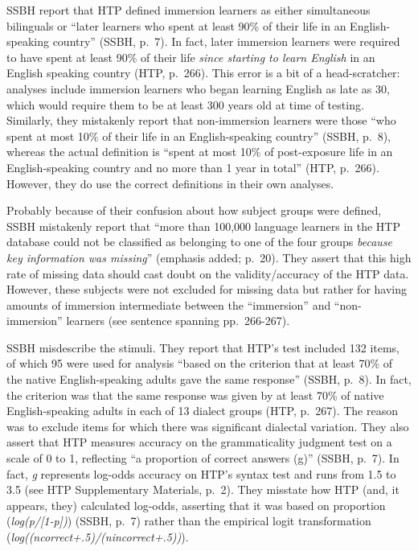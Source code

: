 \begin{appendix}
SSBH report that HTP defined immersion learners as either simultaneous
bilinguals or ``later learners who spent at least 90\% of their life in
an English-speaking country'' (SSBH, p.~7). In fact, later immersion
learners were required to have spent at least 90\% of their life
\emph{since starting to learn English} in an English speaking country
(HTP, p.~266). This error is a bit of a head-scratcher: analyses include
immersion learners who began learning English as late as 30, which would
require them to be at least 300 years old at time of testing. Similarly,
they mistakenly report that non-immersion learners were those ``who
spent at most 10\% of their life in an English-speaking country'' (SSBH,
p.~8), whereas the actual definition is ``spent at most 10\% of
post-exposure life in an English-speaking country and no more than 1
year in total'' (HTP, p.~266). However, they do use the correct
definitions in their own analyses.

Probably because of their confusion about how subject groups were
defined, SSBH mistakenly report that ``more than 100,000 language
learners in the HTP database could not be classified as belonging to one
of the four groups \emph{because key information was missing}''
(emphasis added; p.~20). They assert that this high rate of missing data
should cast doubt on the validity/accuracy of the HTP data. However,
these subjects were not excluded for missing data but rather for having
amounts of immersion intermediate between the ``immersion'' and
``non-immersion'' learners (see sentence spanning pp.~266-267).

SSBH misdescribe the stimuli. They report that HTP's test included 132
items, of which 95 were used for analysis ``based on the criterion that
at least 70\% of the native English-speaking adults gave the same
response'' (SSBH, p.~8). In fact, the criterion was that the same
response was given by at least 70\% of native English-speaking adults in
each of 13 dialect groups (HTP, p.~267). The reason was to exclude items
for which there was significant dialectal variation. They also assert
that HTP measures accuracy on the grammaticality judgment test on a
scale of 0 to 1, reflecting ``a proportion of correct answers (g)''
(SSBH, p.~7). In fact, \emph{g} represents log-odds accuracy on HTP's
syntax test and runs from 1.5 to 3.5 (see HTP Supplementary Materials,
p.~2). They misstate how HTP (and, it appears, they) calculated
log-odds, asserting that it was based on proportion
(\emph{log(p/{[}1-p{]})}) (SSBH, p.~7) rather than the empirical logit
transformation (\emph{log((ncorrect+.5)/(nincorrect+.5))}).


\end{appendix}
